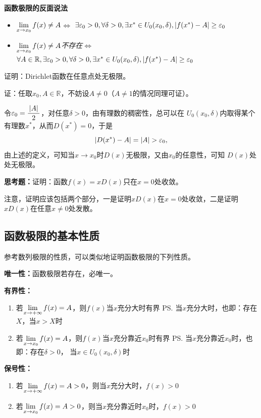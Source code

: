 \begin{shaded}
	\begin{tcolorbox}
		{\bf 函数极限的反面说法}
		\begin{itemize}
		  \item {\it $\lim\limits_{x\to{x_0}}f(x)\ne A$}$\Leftrightarrow$ 
		    $\exists\varepsilon_0>0,\forall\delta>0, \exists x^*\in
		    U_0(x_0,\delta),|f(x^*)-A|\geq\varepsilon_0$ 
		  \item {\it $\lim\limits_{x\to{x_0}}f(x)\ne A$不存在}$\Leftrightarrow$
			$\forall A\in\mathbb{R},\exists\varepsilon_0>0,\forall\delta>0, \exists x^*\in
		    U_0(x_0,\delta),|f(x^*)-A|\geq\varepsilon_0$ 
		\end{itemize}
	\end{tcolorbox}

	\egz 证明：Dirichlet函数在任意点处无极限。
	
	证：任取$x_0,A\in\mathbb{R}$，不妨设$A\ne 0$（$A\ne 1$的情况同理可证）。
	
	令$\varepsilon_0=\displaystyle\frac{\,{|A|}\,}{\,{2}\,}$，对任意$\delta>0$，由有理数的稠密性，总可以在
	$U_0(x_0,\delta)$内取得某个有理数$x^*$，从而$D(x^*)=0$，于是
	$$|D(x^*)-A|=|A|>\e_0,$$
	由上述的定义，可知当$x\to x_0$时$D(x)$无极限，又由$x_0$的任意性，可知
	$D(x)$处处无极限。\fin

	\bs
	
	{\bf 思考题：}证明：函数$f(x)=xD(x)$只在$x=0$处收敛。

	注意，证明应该包括两个部分，一是证明$xD(x)$在$x=0$处收敛，二是证明
	$xD(x)$在任意$x\ne 0$处发散。
\end{shaded}

\subsection{函数极限的基本性质}

参考数列极限的性质，可以类似地证明函数极限的下列性质。

\begin{thx}
	{\bf 唯一性：}函数极限若存在，必唯一。
	
	{\bf 有界性：}
	\begin{enumerate}[(1)]
	  \setlength{\itemindent}{1cm}
	  \item 若$\lim\limits_{x\to{+\infty}}f(x)=A$，则$f(x)$当$x$充分大时有界
 	  \ps{\vspace{-2em}当$x$充分大时，也即：存在$X$，当$x>X$时}
	  \item 若$\lim\limits_{x\to{x_0}}f(x)=A$，则$f(x)$当$x$充分靠近$x_0$时有界
 	  \ps{当$x$充分靠近$x_0$时，也即：存在$\delta>0$，
 	  当$x\in U_0(x_0,\delta)$时}
	\end{enumerate}
	{\bf 保号性：}
	\begin{enumerate}[(1)]
 	  \setlength{\itemindent}{1cm}
	  \item 若$\lim\limits_{x\to{+\infty}}f(x)=A>0$，则当$x$充分大时，$f(x)>0$
	  \item 若$\lim\limits_{x\to{x_0}}f(x)=A>0$，则当$x$充分靠近时$x_0$时，$f(x)>0$
	\end{enumerate}
\end{thx}

